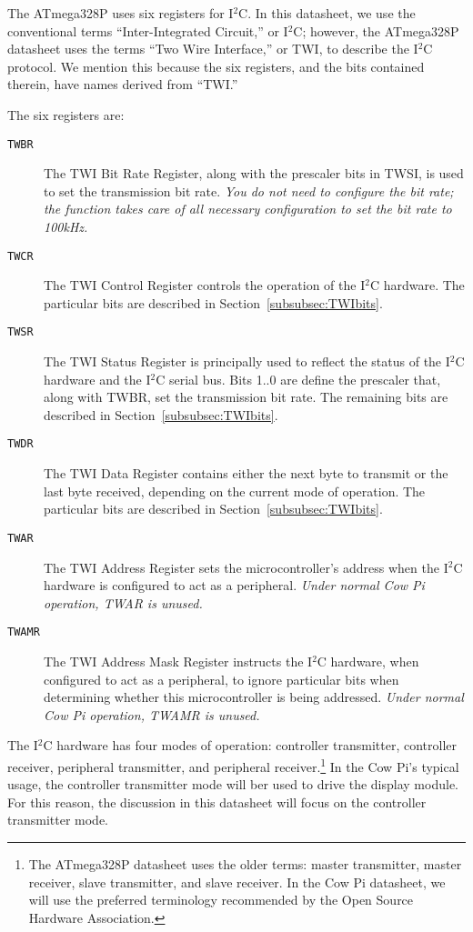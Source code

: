 The ATmega328P uses six registers for I$^2$C\@.
In this datasheet, we use the conventional terms ``Inter-Integrated Circuit,'' or I$^2$C;
however, the ATmega328P datasheet\cite{ATmega328P} uses the terms ``Two Wire Interface,'' or TWI, to describe the I$^2$C protocol.
We mention this because the six registers, and the bits contained therein, have names derived from ``TWI.''

The six registers are:
\begin{description}
    \item[\texttt{TWBR}] The TWI Bit Rate Register, along with the prescaler bits in TWSI, is used to set the transmission bit rate.
                         \textit{You do not need to configure the bit rate; the  function takes care of all necessary configuration to set the bit rate to 100kHz.}
    \item[\texttt{TWCR}] The TWI Control Register controls the operation of the I$^2$C hardware.
                         The particular bits are described in Section~\ref{subsubsec:TWIbits}.
    \item[\texttt{TWSR}] The TWI Status Register is principally used to reflect the status of the I$^2$C hardware and the I$^2$C serial bus.
                         Bits 1..0 are define the prescaler that, along with TWBR, set the transmission bit rate.
                         The remaining bits are described in Section~\ref{subsubsec:TWIbits}.
    \item[\texttt{TWDR}] The TWI Data Register contains either the next byte to transmit or the last byte received, depending on the current mode of operation.
                         The particular bits are described in Section~\ref{subsubsec:TWIbits}.
    \item[\texttt{TWAR}] The TWI Address Register sets the microcontroller's address when the I$^2$C hardware is configured to act as a peripheral.
                         \textit{Under normal Cow Pi operation, TWAR is unused.}
    \item[\texttt{TWAMR}] The TWI Address Mask Register instructs the I$^2$C hardware, when configured to act as a peripheral, to ignore particular bits when determining whether this microcontroller is being addressed.
                          \textit{Under normal Cow Pi operation, TWAMR is unused.}
\end{description}

The I$^2$C hardware has four modes of operation: controller transmitter, controller receiver, peripheral transmitter, and peripheral receiver.\footnote{
    The ATmega328P datasheet uses the older terms: master transmitter, master receiver, slave transmitter, and slave receiver.
    In the Cow Pi datasheet, we will use the preferred terminology recommended by the Open Source Hardware Association.}
In the Cow Pi's typical usage, the controller transmitter mode will ber used to drive the display module.
For this reason, the discussion in this datasheet will focus on the controller transmitter mode.

